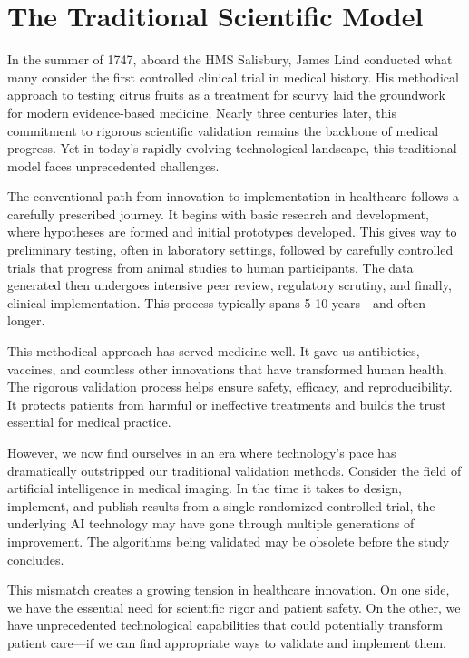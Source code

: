 \documentclass[
  Letterpaper,
]{scrbook}
\begin{document}
\section{The Traditional Scientific
Model}\label{the-traditional-scientific-model}

In the summer of 1747, aboard the HMS Salisbury, James Lind conducted
what many consider the first controlled clinical trial in medical
history. His methodical approach to testing citrus fruits as a treatment
for scurvy laid the groundwork for modern evidence-based medicine.
Nearly three centuries later, this commitment to rigorous scientific
validation remains the backbone of medical progress. Yet in today's
rapidly evolving technological landscape, this traditional model faces
unprecedented challenges.

The conventional path from innovation to implementation in healthcare
follows a carefully prescribed journey. It begins with basic research
and development, where hypotheses are formed and initial prototypes
developed. This gives way to preliminary testing, often in laboratory
settings, followed by carefully controlled trials that progress from
animal studies to human participants. The data generated then undergoes
intensive peer review, regulatory scrutiny, and finally, clinical
implementation. This process typically spans 5-10 years---and often
longer.

This methodical approach has served medicine well. It gave us
antibiotics, vaccines, and countless other innovations that have
transformed human health. The rigorous validation process helps ensure
safety, efficacy, and reproducibility. It protects patients from harmful
or ineffective treatments and builds the trust essential for medical
practice.

However, we now find ourselves in an era where technology's pace has
dramatically outstripped our traditional validation methods. Consider
the field of artificial intelligence in medical imaging. In the time it
takes to design, implement, and publish results from a single randomized
controlled trial, the underlying AI technology may have gone through
multiple generations of improvement. The algorithms being validated may
be obsolete before the study concludes.

This mismatch creates a growing tension in healthcare innovation. On one
side, we have the essential need for scientific rigor and patient
safety. On the other, we have unprecedented technological capabilities
that could potentially transform patient care---if we can find
appropriate ways to validate and implement them.
\end{document}

